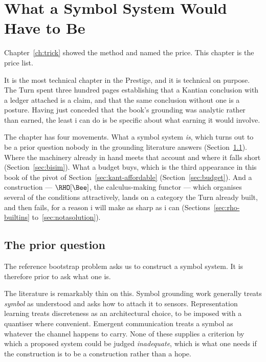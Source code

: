 \chapter{What a Symbol System Would Have to Be}
\label{ch:notation}

Chapter~\ref{ch:trick} showed the method and named the price.
This chapter is the price list.

It is the most technical chapter in the Prestige, and it is
technical on purpose.
The Turn spent three hundred pages establishing that a Kantian
conclusion with a ledger attached is a claim, and that the same
conclusion without one is a posture.
Having just conceded that the book's grounding was analytic rather
than earned, the least i can do is be specific about what earning
it would involve.

The chapter has four movements.
What a symbol system \emph{is}, which turns out to be a prior
question nobody in the grounding literature answers
(Section~\ref{sec:goodman}).
Where the machinery already in hand meets that account and where it
falls short (Section~\ref{sec:bisim}).
What a budget buys, which is the third appearance in this book of
the pivot of Section~\ref{sec:kant-affordable}
(Section~\ref{sec:budget}).
And a construction --- $\RHO[\Bee]$, the calculus-making functor
--- which organises several of the conditions attractively, lands
on a category the Turn already built, and then fails, for a reason
i will make as sharp as i can (Sections~\ref{sec:rho-builtins}
to~\ref{sec:notasolution}).

\section{The prior question}
\label{sec:goodman}

The reference bootstrap problem asks us to construct a symbol
system.
It is therefore prior to ask what one is.

The literature is remarkably thin on this.
Symbol grounding work generally treats \emph{symbol} as understood
and asks how to attach it to sensors.
Representation learning treats discreteness as an architectural
choice, to be imposed with a quantiser where convenient.
Emergent communication treats a symbol as whatever the channel
happens to carry.
None of these supplies a criterion by which a proposed system could
be judged \emph{inadequate}, which is what one needs if the
construction is to be a construction rather than a hope.

